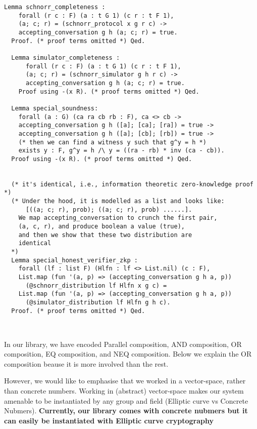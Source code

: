 \documentclass[conference,compsoc]{IEEEtran}
\begin{document}
  
  \begin{lstlisting}[language=Coq]
  Lemma schnorr_completeness : 
    forall (r c : F) (a : t G 1) (c r : t F 1),
    (a; c; r) = (schnorr_protocol x g r c) ->
    accepting_conversation g h (a; c; r) = true.
  Proof. (* proof terms omitted *) Qed.
  
  Lemma simulator_completeness : 
      forall (r c : F) (a : t G 1) (c r : t F 1),
      (a; c; r) = (schnorr_simulator g h r c) ->
      accepting_conversation g h (a; c; r) = true.
    Proof using -(x R). (* proof terms omitted *) Qed. 
  
  Lemma special_soundness: 
    forall (a : G) (ca ra cb rb : F), ca <> cb ->
    accepting_conversation g h ([a]; [ca]; [ra]) = true ->  
    accepting_conversation g h ([a]; [cb]; [rb]) = true ->
    (* then we can find a witness y such that g^y = h *)
    exists y : F, g^y = h /\ y = ((ra - rb) * inv (ca - cb)).
  Proof using -(x R). (* proof terms omitted *) Qed.
  
  
  (* it's identical, i.e., information theoretic zero-knowledge proof *)
  (* Under the hood, it is modelled as a list and looks like:
      [((a; c; r), prob); ((a; c; r), prob) ......].
    We map accepting_conversation to crunch the first pair, 
    (a, c, r), and produce boolean a value (true), 
    and then we show that these two distribution are 
    identical 
  *)
  Lemma special_honest_verifier_zkp : 
    forall (lf : list F) (Hlfn : lf <> List.nil) (c : F), 
    List.map (fun '(a, p) => (accepting_conversation g h a, p))
      (@schnorr_distribution lf Hlfn x g c) = 
    List.map (fun '(a, p) => (accepting_conversation g h a, p))
      (@simulator_distribution lf Hlfn g h c).
  Proof. (* proof terms omitted *) Qed. 
  
  
  \end{lstlisting}
  
In our library, we have encoded Parallel composition, 
AND composition, OR composition, EQ composition, and 
NEQ composition. Below we explain the OR composition
beause it is more involved than the rest. 




 
  However, we would like 
  to emphasise that we worked in a vector-space, rather 
  than concrete numbers. Working in (abstract) vector-space makes our system 
  amenable to be instantiated by any group and field 
  (Elliptic curve vs Concrete Nubmers). \textbf{Currently, 
  our library comes with concrete nubmers but it can easily be 
  instantiated with Elliptic curve cryptography}
\end{document}
